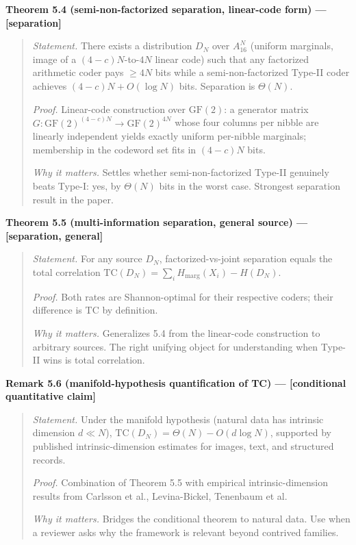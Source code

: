 \documentclass[
]{article}
\begin{document}
\textbf{Theorem 5.4 (semi-non-factorized separation, linear-code form)
--- {[}separation{]}}

\begin{quote}
\emph{Statement.} There exists a distribution $D_N$ over
$A_{16}^N$ (uniform marginals, image of a $(4-c)N$-to-$4N$ linear
code) such that any factorized arithmetic coder pays $\geq 4N$ bits
while a semi-non-factorized Type-II coder achieves
$(4-c)N + O(\log N)$ bits. Separation is $\Theta(N)$.

\emph{Proof.} Linear-code construction over $\mathrm{GF}(2)$: a
generator matrix $G : \mathrm{GF}(2)^{(4-c)N} \to \mathrm{GF}(2)^{4N}$
whose four columns per nibble are linearly independent yields exactly
uniform per-nibble marginals; membership in the codeword set fits in
$(4-c)N$ bits.

\emph{Why it matters.} Settles whether semi-non-factorized Type-II
genuinely beats Type-I: yes, by $\Theta(N)$ bits in the worst case.
Strongest separation result in the paper.
\end{quote}

\textbf{Theorem 5.5 (multi-information separation, general source) ---
{[}separation, general{]}}

\begin{quote}
\emph{Statement.} For any source $D_N$, factorized-vs-joint
separation equals the total correlation
$\mathrm{TC}(D_N) = \sum_i H_{\text{marg}}(X_i) - H(D_N)$.

\emph{Proof.} Both rates are Shannon-optimal for their respective
coders; their difference is $\mathrm{TC}$ by definition.

\emph{Why it matters.} Generalizes 5.4 from the linear-code
construction to arbitrary sources. The right unifying object for
understanding when Type-II wins is total correlation.
\end{quote}

\textbf{Remark 5.6 (manifold-hypothesis quantification of TC) ---
{[}conditional quantitative claim{]}}

\begin{quote}
\emph{Statement.} Under the manifold hypothesis (natural data has
intrinsic dimension $d \ll N$),
$\mathrm{TC}(D_N) = \Theta(N) - O(d \log N)$, supported by published
intrinsic-dimension estimates for images, text, and structured
records.

\emph{Proof.} Combination of Theorem 5.5 with empirical
intrinsic-dimension results from Carlsson et al., Levina-Bickel,
Tenenbaum et al.

\emph{Why it matters.} Bridges the conditional theorem to natural data.
Use when a reviewer asks why the framework is relevant beyond contrived
families.
\end{quote}
\end{document}
